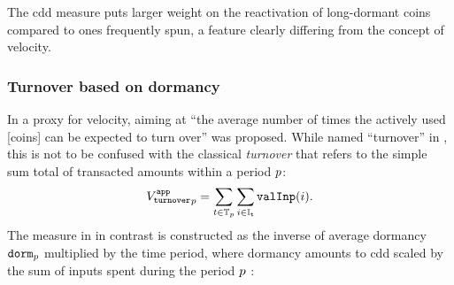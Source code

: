 The \Ac{cdd} measure puts larger weight on the reactivation of long-dormant
coins compared to ones frequently spun, a feature clearly differing from the
concept of velocity. %

\subsubsection{Turnover based on dormancy}
\label{sec:results:sub:approx_crypto:subsub:dorm}%

In \cite{smith2017bitcoin} a proxy for velocity, aiming at ``the average number of times the actively used
[coins] can be expected to turn over'' was proposed. %
While named ``turnover'' in \cite{smith2017bitcoin}, this is not to be confused with the classical \emph{turnover} that refers to the simple sum total of transacted
amounts within a period ${p}$:%
\begin{align}
  \TurnoverP = \sum_{t\in\TxP} \sum_{i\in\InpT} \valI(i).%
\end{align}
The measure in \cite{smith2017bitcoin} in contrast is constructed as the
inverse of average dormancy $\mathtt{dorm}_{p}$ multiplied by the time period, where
dormancy amounts to \ac{cdd} scaled by the sum of inputs spent during the
period ${p}$ \citep[cf.][]{smith2017bitcoin}:%
